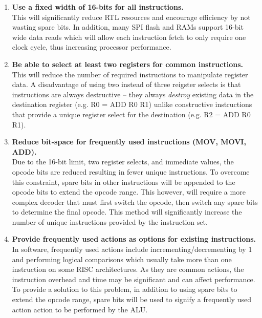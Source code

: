 \documentclass[11pt,a4paper]{report}
\begin{document}
{\begin{enumerate}[leftmargin=3\parindent, label=\bfseries ISA\arabic*., style=nextline]
\item{\textbf{Use a fixed width of 16-bits for all instructions.}\\
This will significantly reduce RTL resources and encourage efficiency by not wasting spare bits. In addition, many SPI flash and RAMs support 16-bit wide data reads which will allow each instruction fetch to only require one clock cycle, thus increasing processor performance.}\label{isa:16}

\item{\textbf{Be able to select at least two registers for common instructions.}\\
This will reduce the number of required instructions to manipulate register data. A disadvantage of using two instead of three reigster selects is that instructions are always destructive -- they always \textit{destroy} existing data in the destination register (e.g. R0 = ADD R0 R1) unlike constructive instructions that provide a unique register select for the destination (e.g. R2 = ADD R0 R1). }\label{isa:regs}

\item{\textbf{Reduce bit-space for frequently used instructions (MOV, MOVI, ADD).}\\
Due to the 16-bit limit, two register selects, and immediate values, the opcode bits are reduced resulting in fewer unique instructions. To overcome this constraint, spare bits in other instructions will be appended to the opcode bits to extend the opcode range. This however, will require a more complex decoder that must first switch the opcode, then switch any spare bits to determine the final opcode. This method will significantly increase the number of unique instructions provided by the instruction set.}\label{isa:bits}

\item{\textbf{Provide frequently used actions as options for existing instructions.}\\
In software, frequently used actions include incrementing/decrementing by 1 and performing logical comparisons which usually take more than one instruction on some RISC architectures. As they are common actions, the instruction overhead and time may be significant and can affect performance. To provide a solution to this problem, in addition to using spare bits to extend the opcode range, spare bits will be used to signify a frequently used action action to be performed by the ALU.

}
\end{enumerate}}
\end{document}
